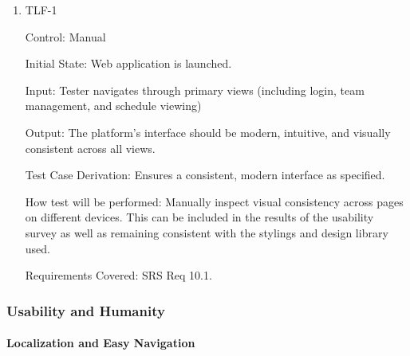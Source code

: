 \documentclass[12pt, titlepage]{article}
\begin{document}
\begin{enumerate}

    \item{TLF-1\\}

          Control: Manual

          Initial State: Web application is launched.

          Input: Tester navigates through primary views (including login, team management, and schedule viewing)

          Output: The platform's interface should be modern, intuitive, and visually consistent across all views.

          Test Case Derivation: Ensures a consistent, modern interface as specified.

          How test will be performed: Manually inspect visual consistency across pages on different devices. This can be included in the results of the usability survey as well as remaining consistent with the stylings and design library used.

          Requirements Covered: SRS Req 10.1.

\end{enumerate}

\subsubsection{Usability and Humanity}

\paragraph{Localization and Easy Navigation}
\end{document}
